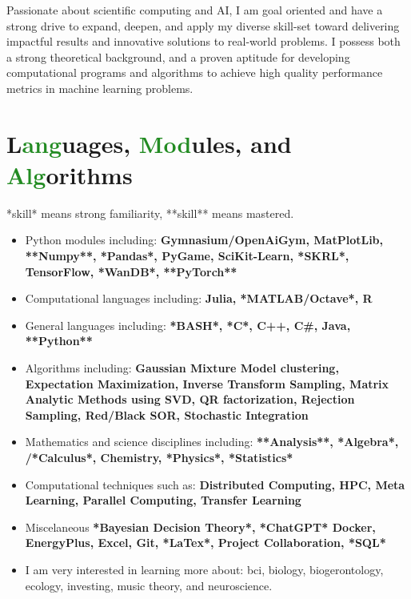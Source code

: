 \documentclass[letterpaper]{twentysecondcv} %
\begin{document}
\makeprofile %


Passionate about scientific computing and AI, I am goal oriented and have a strong drive to expand, deepen, and apply my diverse skill-set toward delivering impactful results and innovative solutions to real-world problems. I possess both a strong theoretical background, and a proven aptitude for developing computational programs and algorithms to achieve high quality performance metrics in machine learning problems.
\section{L\textcolor{ForestGreen}{ang}uages, \textcolor{ForestGreen}{Mod}ules, and \textcolor{ForestGreen}{Alg}orithms}
*skill* means strong familiarity, **skill** means mastered.
\begin{itemize}
\item Python modules including: \textbf{Gymnasium/OpenAiGym, MatPlotLib, **Numpy**, *Pandas*, PyGame, SciKit-Learn, *SKRL*, TensorFlow, *WanDB*, **PyTorch**}
\item Computational languages including: \textbf{Julia, *MATLAB/Octave*, R}
\item General languages including: \textbf{*BASH*, *C*, C++, C\#, Java, **Python**}
\item Algorithms including: \textbf{Gaussian Mixture Model clustering, Expectation Maximization, Inverse Transform Sampling, Matrix Analytic Methods using SVD, QR factorization, Rejection Sampling, Red/Black SOR, Stochastic Integration}
\item Mathematics and science disciplines including: \textbf{**Analysis**, *Algebra*, /*Calculus*, Chemistry, *Physics*, *Statistics*}
\item Computational techniques such as: \textbf{Distributed Computing, HPC, Meta Learning, Parallel Computing, Transfer Learning}
\item Miscelaneous \textbf{*Bayesian Decision Theory*, *ChatGPT* Docker, EnergyPlus, Excel, Git, *LaTex*, Project Collaboration, *SQL*}
\end{itemize}
\begin{itemize}
\item I am very interested in learning more about: bci, biology, biogerontology, ecology, investing, music theory, and neuroscience. 
\end{itemize}
\end{document}
